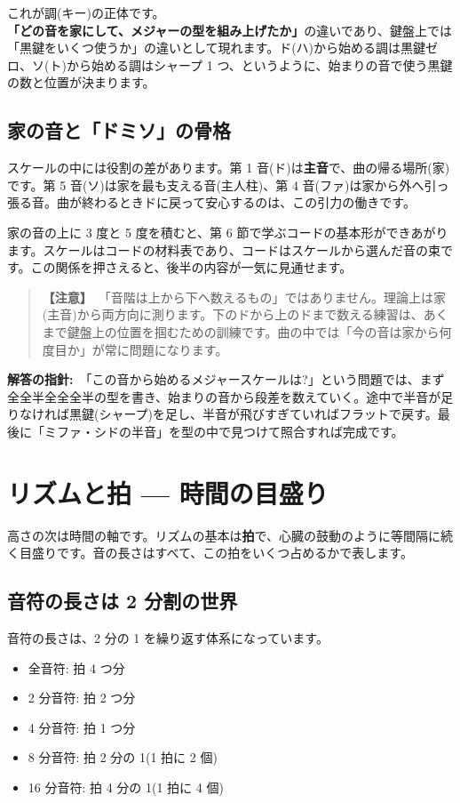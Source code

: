 \documentclass{article}
\begin{document}
これが調(キー)の正体です。\textbf{「どの音を家にして、メジャーの型を組み上げたか」}の違いであり、鍵盤上では「黒鍵をいくつ使うか」の違いとして現れます。ド(ハ)から始める調は黒鍵ゼロ、ソ(ト)から始める調はシャープ 1 つ、というように、始まりの音で使う黒鍵の数と位置が決まります。

\subsection{家の音と「ドミソ」の骨格}

スケールの中には役割の差があります。第 1 音(ド)は\textbf{主音}で、曲の帰る場所(家)です。第 5 音(ソ)は家を最も支える音(主人柱)、第 4 音(ファ)は家から外へ引っ張る音。曲が終わるときドに戻って安心するのは、この引力の働きです。

家の音の上に 3 度と 5 度を積むと、第 6 節で学ぶコードの基本形ができあがります。スケールはコードの材料表であり、コードはスケールから選んだ音の束です。この関係を押さえると、後半の内容が一気に見通せます。

\begin{quote}
\textbf{【注意】}\ 「音階は上から下へ数えるもの」ではありません。理論上は家(主音)から両方向に測ります。下のドから上のドまで数える練習は、あくまで鍵盤上の位置を掴むための訓練です。曲の中では「今の音は家から何度目か」が常に問題になります。
\end{quote}

\textbf{解答の指針:}\ 「この音から始めるメジャースケールは?」という問題では、まず全全半全全全半の型を書き、始まりの音から段差を数えていく。途中で半音が足りなければ黒鍵(シャープ)を足し、半音が飛びすぎていればフラットで戻す。最後に「ミファ・シドの半音」を型の中で見つけて照合すれば完成です。

\section{リズムと拍 — 時間の目盛り}

高さの次は時間の軸です。リズムの基本は\textbf{拍}で、心臓の鼓動のように等間隔に続く目盛りです。音の長さはすべて、この拍をいくつ占めるかで表します。

\subsection{音符の長さは 2 分割の世界}

音符の長さは、2 分の 1 を繰り返す体系になっています。

\begin{itemize}
\item 全音符: 拍 4 つ分
\item 2 分音符: 拍 2 つ分
\item 4 分音符: 拍 1 つ分
\item 8 分音符: 拍 2 分の 1(1 拍に 2 個)
\item 16 分音符: 拍 4 分の 1(1 拍に 4 個)
\end{itemize}
\end{document}
